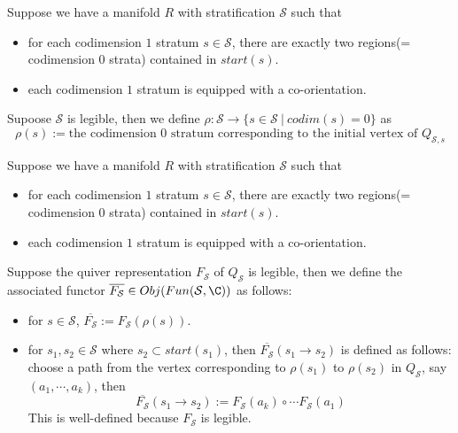 \begin{definition}
Suppose we have a manifold $R$ with stratification $\mathcal{S}$ such that
\begin{itemize}
\item for each codimension $1$ stratum $s\in \mathcal{S}$, there are exactly two regions(= codimension $0$ strata) contained in $start(s)$.

\item each codimension $1$ stratum is equipped with a co-orientation.
\end{itemize}
Supoose $\mathcal{S}$ is legible, then we define $\rho:\mathcal{S}\rightarrow \{s\in \mathcal{S} ~|~ codim(s)=0 \}$ as
\[
\rho(s):=\text{the codimension $0$ stratum corresponding to the initial vertex of $Q_{\mathcal{S},s}$}
\]
\end{definition}

\begin{definition}
Suppose we have a manifold $R$ with stratification $\mathcal{S}$ such that
\begin{itemize}
\item for each codimension $1$ stratum $s\in \mathcal{S}$, there are exactly two regions(= codimension $0$ strata) contained in $start(s)$.

\item each codimension $1$ stratum is equipped with a co-orientation.
\end{itemize}
Suppose the quiver representation $F_\mathcal{S}$ of $Q_\mathcal{S}$ is legible, then we define the associated functor $\overline{F_\mathcal{S}}\in Obj(Fun(\mathcal{S}, \C))$ as follows:
\begin{itemize}
\item for $s\in \mathcal{S}$, $\overline{F_\mathcal{S}} := F_\mathcal{S}(\rho(s))$.

\item for $s_1,s_2 \in \mathcal{S}$ where $s_2 \subset start(s_1)$, then $\overline{F_\mathcal{S}}(s_1 \rightarrow s_2)$ is defined as follows: choose a path from the vertex corresponding to $\rho(s_1)$ to $\rho(s_2)$ in $Q_\mathcal{S}$, say $(a_1,\cdots,a_k)$, then 
\[
\overline{F_\mathcal{S}}(s_1 \rightarrow s_2) := F_\mathcal{S}(a_k)\circ\cdots F_\mathcal{S}(a_1)
\] 
This is well-defined because $F_\mathcal{S}$ is legible.
\end{itemize}
\end{definition}

